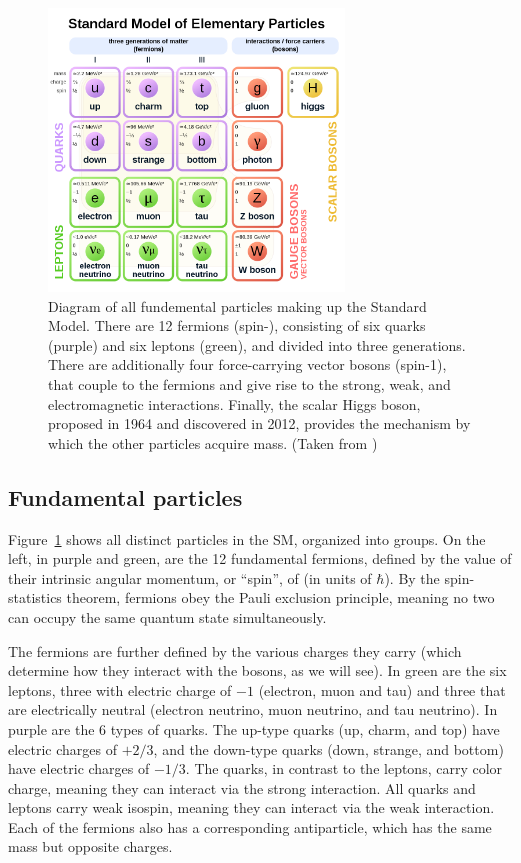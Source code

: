 \begin{figure}[ht]
  \begin{center}
    \includegraphics[width=0.70\textwidth]{figs/theory/standard_model.png}
    \caption{Diagram of all fundemental particles making up the Standard Model. There are 12 fermions (spin-), 
      consisting of six quarks (purple) and six leptons (green), 
      and divided into three generations. There are additionally four force-carrying vector bosons (spin-1),
      that couple to the fermions and give rise to the strong, weak, and electromagnetic interactions.
      Finally, the scalar Higgs boson, proposed in 1964 and discovered in 2012, provides the mechanism
      by which the other particles acquire mass. (Taken from \cite{SM_diagram})
            }
    \label{fig:sm}
  \end{center}
\end{figure}

\subsection{Fundamental particles}

Figure~\ref{fig:sm} shows all distinct particles in the SM, organized into groups.
On the left, in purple and green, are the 12 fundamental fermions, defined by the
value of their intrinsic angular momentum, or ``spin'', of  (in units
of $\hbar$). By the spin-statistics theorem, fermions obey the Pauli exclusion principle,
meaning no two can occupy the same quantum state simultaneously.

The fermions are further defined by the various charges they carry (which determine how they
interact with the bosons, as we will see). In green are the six leptons, three with electric charge
of $-1$ (electron, muon and tau) and three that are electrically neutral (electron neutrino, muon
neutrino, and tau neutrino). In purple are the 6 types of quarks. The up-type quarks (up, charm, and top)
have electric charges of $+2/3$, and the down-type quarks (down, strange, and bottom) have electric
charges of $-1/3$. The quarks, in contrast to the leptons, carry color charge, meaning they
can interact via the strong interaction. All quarks and leptons carry weak isospin, meaning they can interact
via the weak interaction. Each of the fermions also has a corresponding antiparticle, which has the same
mass but opposite charges.

